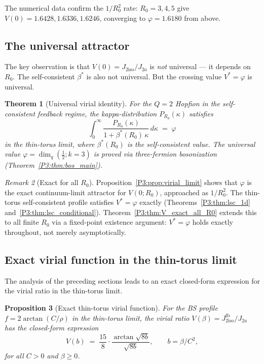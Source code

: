 \documentclass[11pt,a4paper]{article}
\newtheorem{theorem}{Theorem}[section]
\newtheorem{proposition}[theorem]{Proposition}
\theoremstyle{definition}
\theoremstyle{remark}
\newtheorem{remark}[theorem]{Remark}
\newcommand{\vp}{\varphi}
\newcommand{\bst}{\beta^{*}}
\newcommand{\Jfb}{J_{2\mathrm{iso}}^{\mathrm{fb}}}
\newcommand{\Ja}{J_{2a}}
\newcommand{\kk}{\kappa}
\begin{document}
The numerical data confirm the $1/R_0^2$ rate:
$R_0 = 3, 4, 5$ give $V(0) = 1.6428, 1.6336, 1.6246$,
converging to $\vp = 1.6180$ from above.

\subsection{The universal attractor}

The key observation is that $V(0) = J_{2\mathrm{iso}}/J_{2a}$ is
\emph{not} universal --- it depends on $R_0$.
The self-consistent $\bst$ is also not universal.
But the crossing value $V^* = \vp$ is universal.

\begin{theorem}[Universal virial identity]
\label{P3:conj:kappa_universal}
For the $Q=2$ Hopfion in the self-consistent feedback regime,
the kappa-distribution $P_{R_0}(\kk)$ satisfies
\begin{equation}
  \int_0^\infty \frac{P_{R_0}(\kk)}{1 + \bst(R_0)\,\kk}\,d\kk
  \;=\; \vp
  \label{P3:eq:universal_phi}
\end{equation}
in the thin-torus limit, where $\bst(R_0)$ is the self-consistent value.
The universal value $\vp = \dim_q(\tfrac{1}{2};k{=}3)$ is proved via
three-fermion bosonization (Theorem~\ref{P3:thm:bos_main}).
\end{theorem}

\begin{remark}[Exact for all $R_0$]
\label{P3:rem:exact_for_all_R0}
Proposition~\ref{P3:prop:virial_limit} shows that $\vp$ is the exact
continuum-limit attractor for $V(0;R_0)$, approached as $1/R_0^2$.
The thin-torus self-consistent profile satisfies $V^*=\vp$ exactly
(Theorems~\ref{P3:thm:lsc_1d} and~\ref{P3:thm:lsc_conditional}).
Theorem~\ref{P3:thm:V_exact_all_R0} extends this to all finite $R_0$
via a fixed-point existence argument: $V^*=\vp$ holds exactly
throughout, not merely asymptotically.
\end{remark}


\subsection{Exact virial function in the thin-torus limit}
\label{P3:sec:exact_virial}

The analysis of the preceding sections leads to an exact closed-form
expression for the virial ratio in the thin-torus limit.

\begin{proposition}[Exact thin-torus virial function]
\label{P3:prop:virial_exact}
For the BS profile $f = 2\arctan(C/\rho)$ in the thin-torus limit,
the virial ratio $V(\beta) = \Jfb/\Ja$ has the closed-form expression
\begin{equation}
  V(b) \;=\; \frac{15}{8} \cdot \frac{\arctan\!\sqrt{8b}}{\sqrt{8b}},
  \qquad b = \beta/C^2,
  \label{P3:eq:V_exact}
\end{equation}
for all $C > 0$ and $\beta \geq 0$.
\end{proposition}
\end{document}
